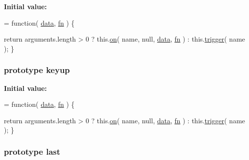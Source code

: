 {\bfseries Initial value\-:}
\begin{DoxyCode}
= \textcolor{keyword}{function}( \hyperlink{jquery-1_810_82-vsdoc_8js_a609407b3456fdc3c5671a9fc4a226ff7}{data}, \hyperlink{jquery-1_810_82-vsdoc_8js_acef6bdaf6b9b20fdcca1ea86f0902c3b}{fn} ) \{


        \textcolor{keywordflow}{return} arguments.length > 0 ?
            this.\hyperlink{jquery-1_810_82-vsdoc_8js_ae453b412b883f60220d73468ef6c6dbc}{on}( name, null, \hyperlink{jquery-1_810_82-vsdoc_8js_a609407b3456fdc3c5671a9fc4a226ff7}{data}, \hyperlink{jquery-1_810_82-vsdoc_8js_acef6bdaf6b9b20fdcca1ea86f0902c3b}{fn} ) :
            this.\hyperlink{jquery-1_810_82-vsdoc_8js_a2388c4114d5e3e4eab020f973641519c}{trigger}( name );
    \}
\end{DoxyCode}
\hypertarget{jquery-1_810_82-vsdoc_8js_a807aea8640f7889d0e97428a1ee2c637}{
\subsubsection[{keyup}]{ {\bf prototype} keyup}}\label{jquery-1_810_82-vsdoc_8js_a807aea8640f7889d0e97428a1ee2c637}
{\bfseries Initial value\-:}
\begin{DoxyCode}
= \textcolor{keyword}{function}( \hyperlink{jquery-1_810_82-vsdoc_8js_a609407b3456fdc3c5671a9fc4a226ff7}{data}, \hyperlink{jquery-1_810_82-vsdoc_8js_acef6bdaf6b9b20fdcca1ea86f0902c3b}{fn} ) \{


        \textcolor{keywordflow}{return} arguments.length > 0 ?
            this.\hyperlink{jquery-1_810_82-vsdoc_8js_ae453b412b883f60220d73468ef6c6dbc}{on}( name, null, \hyperlink{jquery-1_810_82-vsdoc_8js_a609407b3456fdc3c5671a9fc4a226ff7}{data}, \hyperlink{jquery-1_810_82-vsdoc_8js_acef6bdaf6b9b20fdcca1ea86f0902c3b}{fn} ) :
            this.\hyperlink{jquery-1_810_82-vsdoc_8js_a2388c4114d5e3e4eab020f973641519c}{trigger}( name );
    \}
\end{DoxyCode}
\hypertarget{jquery-1_810_82-vsdoc_8js_a5a9684d230de11a6ec3029bcce128977}{
\subsubsection[{last}]{ {\bf prototype} last}}\label{jquery-1_810_82-vsdoc_8js_a5a9684d230de11a6ec3029bcce128977}
